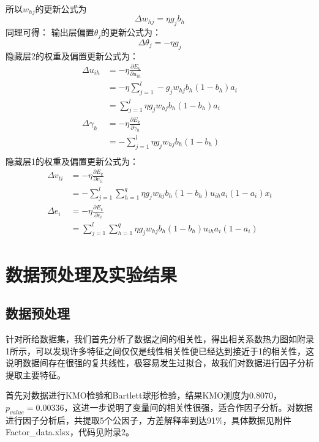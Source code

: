 \documentclass{progartcn}
\begin{document}
所以$w_{hj}$的更新公式为
\begin{equation}
	\Delta w_{hj}=\eta g_jb_h
\end{equation}
同理可得：
输出层偏置$\theta_j$的更新公式为：
\begin{equation}
	\Delta \theta_j=-\eta g_j
\end{equation}
隐藏层2的权重及偏置更新公式为：
\begin{equation}
	\begin{aligned}
		\Delta u_{ih}&=-\eta \frac{\partial E_k}{\partial u_{ih}} \\		
		&=-\eta \sum_{j=1}^{l}-g_jw_{hj}b_h(1-b_h)a_i \\
		&=\sum_{j=1}^{l}\eta g_jw_{hj}b_h(1-b_h)a_i \\
		\Delta \gamma_h &=-\eta \frac{\partial E_k}{\partial \gamma_h} \\
		&=-\sum_{j=1}^{l}\eta g_jw_{hj}b_h(1-b_h) \\
	\end{aligned}
\end{equation}
隐藏层1的权重及偏置更新公式为：
\begin{equation}
	\begin{aligned}
		\Delta v_{ti}&=-\eta \frac{\partial E_k}{\partial v_{ti}} \\
		&=-\sum_{j=1}^{l}\sum_{h=1}^{q}\eta g_jw_{hj}b_h(1-b_h)u_{ih}a_i(1-a_i)x_t \\
		\Delta e_i &=-\eta \frac{\partial E_k}{\partial e_i} \\
		&=\sum_{j=1}^{l}\sum_{h=1}^{q}\eta g_jw_{hj}b_h(1-b_h)u_{ih}a_i(1-a_i)
	\end{aligned}
\end{equation}

\section{数据预处理及实验结果}

\subsection{数据预处理}

针对所给数据集，我们首先分析了数据之间的相关性，得出相关系数热力图如附录1所示，可以发现许多特征之间仅仅是线性相关性便已经达到接近于1的相关性，这说明数据间存在很强的复共线性，极容易发生过拟合，故我们对数据进行因子分析提取主要特征。

首先对数据进行KMO检验和Bartlett球形检验，结果KMO测度为0.8070，$p_{value}=0.00336$，这进一步说明了变量间的相关性很强，适合作因子分析。对数据进行因子分析后，共提取5个公因子，方差解释率到达91\%，具体数据见附件Factor\_data.xlsx，代码见附录2。
\end{document}
